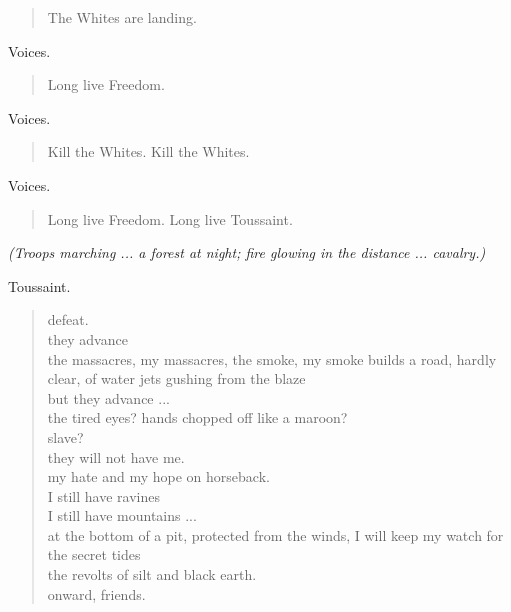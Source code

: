 \documentclass[letterpaper,article,12pt,oneside,notitlepage]{memoir}
\begin{document}
\begin{verse}
\hspace{1cm} The Whites are landing. \\
\end{verse}

\begin{center}Voices.\end{center}

\begin{verse}
\hspace{1cm} Long live Freedom. \\
\end{verse}

\begin{center}Voices.\end{center}

\begin{verse}
\hspace{1cm} Kill the Whites. Kill the Whites. \\
\end{verse}

\begin{center}Voices.\end{center}

\begin{verse}
\hspace{1cm} Long live Freedom. Long live Toussaint. \\
\end{verse}

\textit{(Troops marching ... a forest at night; fire glowing in the distance ... cavalry.)}

\clearpage

\begin{center}Toussaint.\end{center}

\begin{verse}
defeat. \\
they advance \\
the massacres, my massacres, the smoke, my smoke builds a road, hardly clear, of water jets gushing from the blaze \\
but they advance ... \\
the tired eyes? hands chopped off like a maroon? \\
slave? \\
they will not have me. \\
my hate and my hope on horseback. \\
I still have ravines \\
I still have mountains ... \\
at the bottom of a pit, protected from the winds, I will keep my watch for the secret tides \\
the revolts of silt and black earth. \\
onward, friends. \\
\end{verse}
\end{document}
